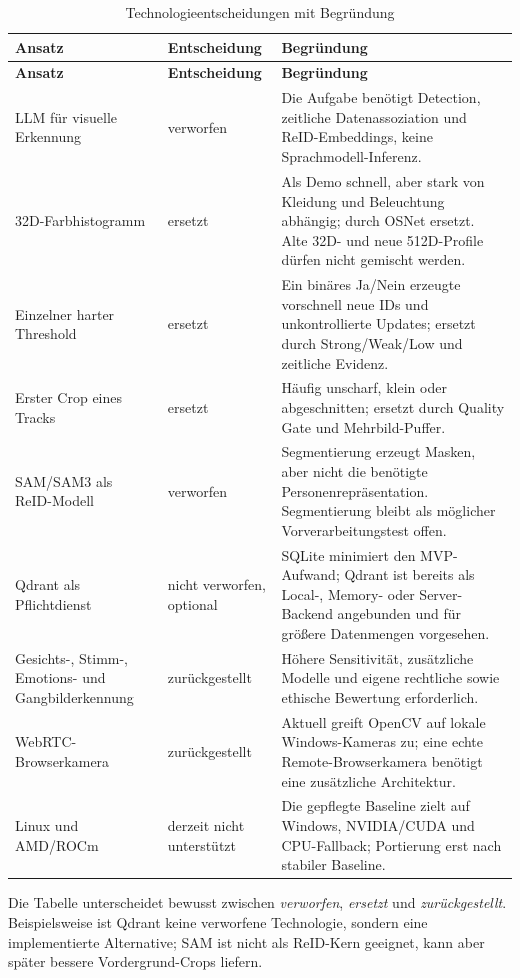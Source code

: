 {\small
\begin{longtable}{L{31mm}L{27mm}L{76mm}}
  \caption{Technologieentscheidungen mit Begründung}
  \label{tab:decisions} \\
  \toprule
  \textbf{Ansatz} & \textbf{Entscheidung} & \textbf{Begründung} \\
  \midrule
  \endfirsthead
  \toprule
  \textbf{Ansatz} & \textbf{Entscheidung} & \textbf{Begründung} \\
  \midrule
  \endhead
  LLM für visuelle Erkennung & verworfen & Die Aufgabe benötigt Detection, zeitliche Datenassoziation und ReID-Embeddings, keine Sprachmodell-Inferenz. \\
  32D-Farbhistogramm & ersetzt & Als Demo schnell, aber stark von Kleidung und Beleuchtung abhängig; durch OSNet ersetzt. Alte 32D- und neue 512D-Profile dürfen nicht gemischt werden. \\
  Einzelner harter Threshold & ersetzt & Ein binäres Ja/Nein erzeugte vorschnell neue IDs und unkontrollierte Updates; ersetzt durch Strong/Weak/Low und zeitliche Evidenz. \\
  Erster Crop eines Tracks & ersetzt & Häufig unscharf, klein oder abgeschnitten; ersetzt durch Quality Gate und Mehrbild-Puffer. \\
  SAM/SAM3 als ReID-Modell & verworfen & Segmentierung erzeugt Masken, aber nicht die benötigte Personenrepräsentation. Segmentierung bleibt als möglicher Vorverarbeitungstest offen. \\
  Qdrant als Pflichtdienst & nicht verworfen, optional & SQLite minimiert den MVP-Aufwand; Qdrant ist bereits als Local-, Memory- oder Server-Backend angebunden und für größere Datenmengen vorgesehen. \\
  Gesichts-, Stimm-, Emotions- und Gangbilderkennung & zurückgestellt & Höhere Sensitivität, zusätzliche Modelle und eigene rechtliche sowie ethische Bewertung erforderlich. \\
  WebRTC-Browserkamera & zurückgestellt & Aktuell greift OpenCV auf lokale Windows-Kameras zu; eine echte Remote-Browserkamera benötigt eine zusätzliche Architektur. \\
  Linux und AMD/ROCm & derzeit nicht unterstützt & Die gepflegte Baseline zielt auf Windows, NVIDIA/CUDA und CPU-Fallback; Portierung erst nach stabiler Baseline. \\
  \bottomrule
\end{longtable}
}

Die Tabelle unterscheidet bewusst zwischen \emph{verworfen}, \emph{ersetzt}
und \emph{zurückgestellt}. Beispielsweise ist Qdrant keine verworfene
Technologie, sondern eine implementierte Alternative; SAM ist nicht als
ReID-Kern geeignet, kann aber später bessere Vordergrund-Crops liefern.


